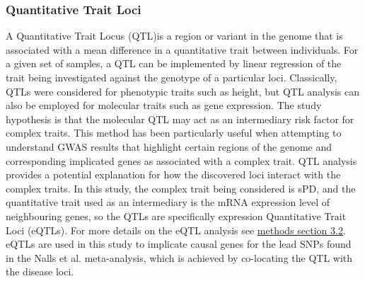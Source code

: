 \documentclass{article}
\begin{document}
\subsubsection{Quantitative Trait Loci}
\label{subsubsec:QTL}
A Quantitative Trait Locus (QTL)is a region or variant in the genome that is associated with a mean difference in a quantitative trait between individuals. For a given set of samples, a QTL can be implemented by linear regression of the trait being investigated against the genotype of a particular loci\cite{Duffy2017AnalysisLoci}. Classically, QTLs were considered for phenotypic traits such as height, but QTL analysis can also be employed for molecular traits such as gene expression. The study hypothesis is that the molecular QTL may act as an intermediary risk factor for complex traits. This method has been particularly useful when attempting to understand GWAS results that highlight certain regions of the genome and corresponding implicated genes as associated with a complex trait. QTL analysis provides a potential explanation for how the discovered loci interact with the complex traits\cite{Neumeyer2020StrengtheningLoci}. In this study, the complex trait being considered is sPD, and the quantitative trait used as an intermediary is the mRNA expression level of neighbouring genes, so the QTLs are specifically expression Quantitative Trait Loci (eQTLs). For more details on the eQTL analysis see \hyperref[subsec:eQTL]{methods section 3.2}. eQTLs are used in this study to implicate causal genes for the lead SNPs found in the Nalls et al.\cite{Nalls2019IdentificationStudies} meta-analysis, which is achieved by co-locating the QTL with the disease loci.
\end{document}
